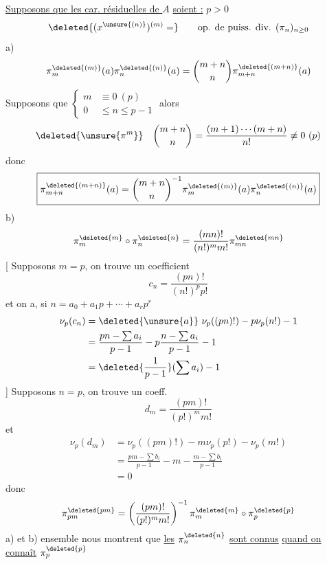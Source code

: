 \uline{Supposons que les car. résiduelles de $A$} \uline{soient :} $p>0$
\[
\deleted{(x^{\unsure{(n)}})^{(m)}=}\qquad\text{op. de puiss. div. }(\pi_n)_{n\geq0}
\]
a)
\[
\pi_m^{\deleted{(m)}}(a)\pi_n^{\deleted{(n)}}(a)=\binom{m+n}{n}\pi_{m+n}^{\deleted{(m+n)}}(a)
\]
Supposons que $\left\{\begin{aligned}m&\equiv0\ (p)\\0&\leq n\leq p-1\end{aligned}\right.$ alors
\[
\deleted{\unsure{\pi^m}}\quad\binom{m+n}{n}=\frac{(m+1)\cdots(m+n)}{n!}\not\equiv0\ (p)
\]
donc
\[
\boxed{\pi_{m+n}^{\deleted{(m+n)}}(a)=\binom{m+n}{n}^{-1}\pi_m^{\deleted{(m)}}(a)\pi_n^{\deleted{(n)}}(a)}
\]
b)
\[
\pi_m^{\deleted{m}}\circ\pi_n^{\deleted{n}}=\frac{(mn)!}{(n!)^m m!}\pi_{mn}^{\deleted{mn}}
\]
[ Supposons $m=p$, on trouve un coefficient
\[
c_n=\frac{(pn)!}{(n!)^p p!}
\]
et on a, si $n=a_0+a_1p+\cdots+a_rp^r$
\[
\begin{aligned}
\nu_p(c_n)&=\deleted{\unsure{a}}\ \nu_p((pn)!)-p\nu_p(n!)-1\\
&=\frac{pn-\sum a_i}{p-1}-p\frac{n-\sum a_i}{p-1}-1\\
&=\deleted{\frac{1}{p-1}}(\sum a_i)-1
\end{aligned}
\]
]
Supposons $n=p$, on trouve un coeff.
\[
d_m=\frac{(pm)!}{(p!)^m m!}
\]
et
\[
\begin{aligned}
\nu_p(d_m)&=\nu_p((pm)!)-m\nu_p(p!)-\nu_p(m!)\\
&=\frac{pm-\sum b_i}{p-1}-m-\frac{m-\sum b_i}{p-1}\\
&=0
\end{aligned}
\]
donc
\[
\pi_{pm}^{\deleted{pm}}=\left(\frac{(pm)!}{(p!)^m m!}\right)^{-1}\pi_m^{\deleted{m}}\circ\pi_p^{\deleted{p}}
\]
a) et b) ensemble nous montrent que \uline{les} $\pi_n^{\deleted{n}}$ \uline{sont connus} \uline{quand on connaît} $\pi_p^{\deleted{p}}$
